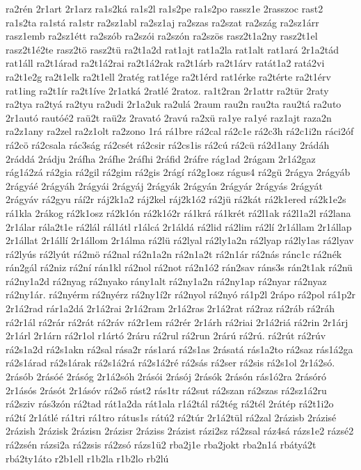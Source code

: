 {ra2rén
2r1art
2r1arz
ra1s2ká
ra1s2l
ra1s2pe
ra1s2po
rassz1e
2rasszoc
rast2
ra1s2ta
ra1stá
ra1str
ra2sz1abl
ra2sz1aj
ra2szas
ra2szat
ra2szág
ra2sz1árr
rasz1emb
ra2sz1étt
ra2szób
ra2szói
ra2szón
ra2szös
rasz2t1a2ny
rasz2t1el
rasz2t1é2te
rasz2tö
rasz2tü
ra2t1a2d
rat1ajt
rat1a2la
rat1alt
rat1ará
2r1a2tád
rat1áll
ra2t1árad
ra2t1á2rai
ra2t1á2rak
ra2t1árb
ra2t1árv
ratát1a2
ratá2vi
ra2t1e2g
ra2t1elk
ra2t1ell
2ratég
rat1ége
ra2t1érd
rat1érke
ra2térte
ra2t1érv
rat1ing
ra2t1ír
ra2t1íve
2r1atká
2ratlé
2ratoz.
ra1t2ran
2r1attr
ra2tür
2raty
ra2tya
ra2tyá
ra2tyu
ra2udi
2r1a2uk
ra2ulá
2raum
rau2n
rau2ta
rau2tá
ra2uto
2r1autó
rautóé2
raü2t
raü2z
2ravató
2ravú
ra2xü
ra1ye
ra1yé
raz1ajt
raza2n
ra2z1any
ra2zel
ra2z1olt
ra2zono
1rá
rá1bre
rá2cal
rá2c1e
rá2c3h
rá2c1i2n
ráci2óf
rá2cö
rá2csala
rác3ság
rá2csét
rá2csir
rá2cs1is
rá2cú
rá2cü
rá2d1any
2rádáh
2ráddá
2rádju
2ráfha
2ráfhe
2ráfhi
2ráfid
2ráfre
rág1ad
2rágam
2r1á2gaz
rág1á2zá
rá2gia
rá2gil
rá2gim
rá2gis
2rágí
rá2g1osz
rágus4
rá2gü
2rágya
2rágyáb
2rágyáé
2rágyáh
2rágyái
2rágyáj
2rágyák
2rágyán
2rágyár
2rágyás
2rágyát
2rágyáv
rá2gyu
ráí2r
ráj2k1a2
ráj2kel
ráj2k1ó2
rá2jü
rá2kát
rá2k1ered
rá2k1e2s
rá1kla
2rákog
rá2k1osz
rá2k1ón
rá2k1ó2r
rá1krá
rá1krét
rá2l1ak
rá2l1a2l
rá2lana
2r1álar
rála2t1e
rá2lál
rál1átl
r1álcá
2r1áldá
rá2lid
rá2lim
rá2lí
2r1állam
2r1állap
2r1állat
2r1állí
2r1állom
2r1álma
rá2lü
rá2lyal
rá2ly1a2n
rá2lyap
rá2ly1as
rá2lyav
rá2lyús
rá2lyút
rá2mö
rá2nal
rá2n1a2n
rá2n1a2t
rá2n1ár
rá2nás
ránc1c
rá2nék
rán2gál
rá2niz
rá2ní
rán1kl
rá2nol
rá2not
rá2n1ó2
rán2sav
ráns3s
rán2t1ak
rá2nü
rá2ny1a2d
rá2nyag
rá2nyako
rány1alt
rá2ny1a2n
rá2ny1ap
rá2nyar
rá2nyaz
rá2ny1ár.
rá2nyérm
rá2nyérz
rá2ny1í2r
rá2nyol
rá2nyó
rá1p2l
2rápo
rá2pol
rá1p2r
2r1á2rad
rár1a2dá
2r1á2rai
2r1á2ram
2r1á2ras
2r1á2rat
rá2raz
rá2ráb
rá2ráh
rá2r1ál
rá2rár
rá2rát
rá2ráv
rá2r1em
rá2rér
2r1árh
rá2riai
2r1á2riá
rá2rin
2r1árj
2r1árl
2r1árn
rá2r1ol
r1ártó
2ráru
rá2rul
rá2run
2rárú
rá2rú.
rá2rút
rá2rúv
rá2s1a2d
rá2s1akn
rá2sal
rása2r
rás1ará
rá2s1as
2rásatá
rás1a2to
rá2saz
rás1á2ga
rá2s1árad
rá2s1árak
rá2s1á2rá
rá2s1á2ré
rá2sás
rá2ser
rá2sis
rá2s1ol
2r1á2só.
2rásób
2rásóé
2rásóg
2r1á2sóh
2rásói
2rásój
2rásók
2rásón
rás1ó2ra
2rásóró
2r1ásós
2rásót
2r1ásóv
rá2ső
rást2
rás1tr
rá2sut
rá2szan
rá2szas
rá2sz1á2ru
rá2sziv
rás3zón
rá2tad
rát1a2da
rát1ala
r1á2tál
rá2tég
rá2tél
2rátép
rá2t1i2o
rá2tí
2r1átlé
rá1tri
rá1tro
rátus1s
rátú2
rá2túr
2r1á2tül
rá2zal
2rázisb
2rázisé
2rázish
2rázisk
2rázisn
2rázisr
2ráziss
2rázist
rázi2sz
rá2zsal
ráz4sá
rázs1e2
rázsé2
rá2zsén
rázsi2a
rá2zsis
rá2zsó
rázs1ü2
rba2j1e
rba2jokt
rba2n1á
rbátyá2t
rbá2ty1áto
r2b1ell
r1b2la
r1b2lo
rb2lú
}
